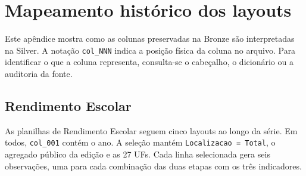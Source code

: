 \chapter{Mapeamento histórico dos layouts}
\label{ap:layouts}
\setlength{\tabcolsep}{2pt}
\setlength{\emergencystretch}{3em}

Este apêndice mostra como as colunas preservadas na Bronze são interpretadas na Silver. A notação \texttt{col\_NNN} indica a posição física da coluna no arquivo. Para identificar o que a coluna representa, consulta-se o cabeçalho, o dicionário ou a auditoria da fonte.

\section{Rendimento Escolar}

As planilhas de Rendimento Escolar seguem cinco layouts ao longo da série. Em todos, \texttt{col\_001} contém o ano. A seleção mantém \texttt{Localizacao = Total}, o agregado público da edição e as 27 UFs. Cada linha selecionada gera seis observações, uma para cada combinação das duas etapas com os três indicadores.

